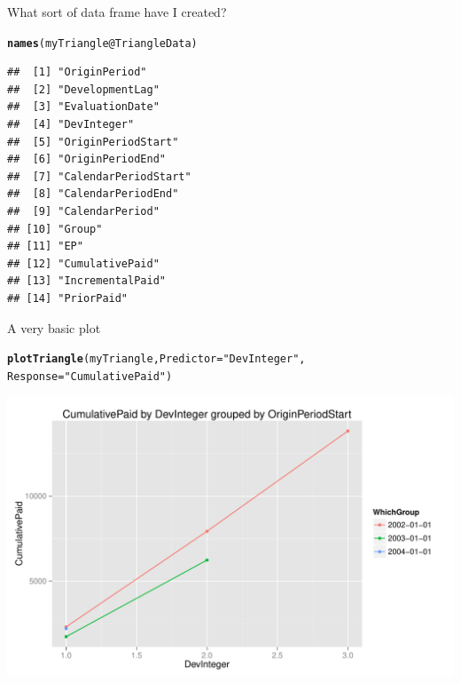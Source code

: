 \documentclass[xcolor=dvipsnames]{beamer}\usepackage{graphicx, color}
\makeatletter
\def\maxwidth{ %
  \ifdim\Gin@nat@width>\linewidth
    \linewidth
  \else
    \Gin@nat@width
  \fi
}
\newcommand{\hlfunctioncall}[1]{\textcolor[rgb]{0.501960784313725,0,0.329411764705882}{\textbf{#1}}}%
\newcommand{\hlstring}[1]{\textcolor[rgb]{0.6,0.6,1}{#1}}%
\newenvironment{kframe}{%
 \def\at@end@of@kframe{}%
 \ifinner\ifhmode%
  \def\at@end@of@kframe{\end{minipage}}%
  \begin{minipage}{\columnwidth}%
 \fi\fi%
 \def\FrameCommand##1{\hskip\@totalleftmargin \hskip-\fboxsep
 \colorbox{shadecolor}{##1}\hskip-\fboxsep
     \hskip-\linewidth \hskip-\@totalleftmargin \hskip\columnwidth}%
 \MakeFramed {\advance\hsize-\width
   \@totalleftmargin\z@ \linewidth\hsize
   \@setminipage}}%
 {\par\unskip\endMakeFramed%
 \at@end@of@kframe}
\newenvironment{knitrout}{}{} %
\makeatother
\begin{document}
\begin{frame}[fragile]{What sort of data frame have I created?}
\begin{knitrout}
\color{fgcolor}\begin{kframe}
\begin{alltt}
\hlfunctioncall{names}(myTriangle@TriangleData)
\end{alltt}
\begin{verbatim}
##  [1] "OriginPeriod"       
##  [2] "DevelopmentLag"     
##  [3] "EvaluationDate"     
##  [4] "DevInteger"         
##  [5] "OriginPeriodStart"  
##  [6] "OriginPeriodEnd"    
##  [7] "CalendarPeriodStart"
##  [8] "CalendarPeriodEnd"  
##  [9] "CalendarPeriod"     
## [10] "Group"              
## [11] "EP"                 
## [12] "CumulativePaid"     
## [13] "IncrementalPaid"    
## [14] "PriorPaid"
\end{verbatim}
\end{kframe}
\end{knitrout}

\end{frame}

\begin{frame}[fragile]{A very basic plot}
\begin{knitrout}
\color{fgcolor}\begin{kframe}
\begin{alltt}
\hlfunctioncall{plotTriangle}(myTriangle, Predictor = \hlstring{"DevInteger"}, 
    Response = \hlstring{"CumulativePaid"})
\end{alltt}
\end{kframe}
\includegraphics[width=\maxwidth]{figure/VeryBasicExample4} 

\end{knitrout}

\end{frame}
\end{document}
